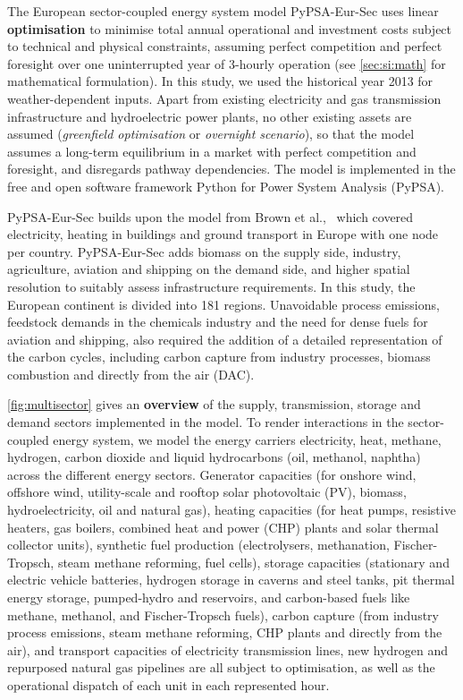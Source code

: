 The European sector-coupled energy system model PyPSA-Eur-Sec uses linear
\textbf{optimisation} to minimise total annual operational and investment costs
subject to technical and physical constraints, assuming perfect competition and
perfect foresight over one uninterrupted year of 3-hourly operation (see
\cref{sec:si:math} for mathematical formulation). In this study, we used the
historical year 2013 for weather-dependent inputs. Apart from existing
electricity and gas transmission infrastructure and hydroelectric power plants,
no other existing assets are assumed (\textit{greenfield optimisation} or
\textit{overnight scenario}), so that the model assumes a long-term equilibrium
in a market with perfect competition and foresight, and disregards pathway
dependencies. The model is implemented in the free and open software framework
Python for Power System Analysis (PyPSA).\cite{brownPyPSAPython2018}

PyPSA-Eur-Sec builds upon the model from Brown et
al.,~\cite{brownSynergiesSector2018} which covered electricity, heating in
buildings and ground transport in Europe with one node per country.
PyPSA-Eur-Sec adds biomass on the supply side, industry, agriculture, aviation
and shipping on the demand side, and higher spatial resolution to suitably
assess infrastructure requirements. In this study, the European continent is
divided into 181 regions. Unavoidable process emissions, feedstock demands in
the chemicals industry and the need for dense fuels for aviation and shipping,
also required the addition of a detailed representation of the carbon cycles,
including carbon capture from industry processes, biomass combustion and
directly from the air (DAC).

\cref{fig:multisector} gives an \textbf{overview} of the supply, transmission,
storage and demand sectors implemented in the model. To render interactions in
the sector-coupled energy system, we model the energy carriers electricity,
heat, methane, hydrogen, carbon dioxide and liquid hydrocarbons (oil, methanol,
naphtha) across the different energy sectors. Generator capacities (for onshore
wind, offshore wind, utility-scale and rooftop solar photovoltaic (PV), biomass,
hydroelectricity, oil and natural gas), heating capacities (for heat pumps,
resistive heaters, gas boilers, combined heat and power (CHP) plants and solar
thermal collector units), synthetic fuel production (electrolysers, methanation,
Fischer-Tropsch, steam methane reforming, fuel cells), storage capacities
(stationary and electric vehicle batteries, hydrogen storage in caverns and
steel tanks, pit thermal energy storage, pumped-hydro and reservoirs, and
carbon-based fuels like methane, methanol, and Fischer-Tropsch fuels), carbon
capture (from industry process emissions, steam methane reforming, CHP plants
and directly from the air), and transport capacities of electricity transmission
lines, new hydrogen and repurposed natural gas pipelines are all subject to
optimisation, as well as the operational dispatch of each unit in each
represented hour.

